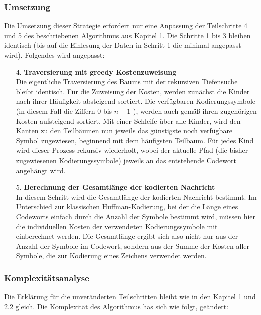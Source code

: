 \documentclass[a4paper,10pt,ngerman]{scrartcl}
\begin{document}
\subsubsection{Umsetzung}
Die Umsetzung dieser Strategie erfordert nur eine Anpassung der Teilschritte 4 und 5 des beschriebenen Algorithmus aus Kapitel 1. Die Schritte 1 bis 3 bleiben identisch (bis auf die Einlesung der Daten in Schritt 1 die minimal angepasst wird). Folgendes wird angepasst:

\begin{enumerate}
  \item [4.] \textbf{Traversierung mit greedy Kostenzuweisung}\\
  Die eigentliche Traversierung des Baums mit der rekursiven Tiefensuche bleibt identisch. Für die Zuweisung der Kosten, werden zunächst die Kinder nach ihrer Häufigkeit absteigend sortiert. Die verfügbaren Kodierungssymbole (in diesem Fall die Ziffern $0$ bis $n-1$ ), werden auch gemäß ihren zugehörigen Kosten aufsteigend sortiert. Mit einer Schleife über alle Kinder, wird den Kanten zu den Teilbäumen nun jeweils das günstigste noch verfügbare Symbol zugewiesen, beginnend mit dem häufigsten Teilbaum. Für jedes Kind wird dieser Prozess rekursiv wiederholt, wobei der aktuelle Pfad (die bisher zugewiesenen Kodierungssymbole) jeweils an das entstehende Codewort angehängt wird. 
  \item[5.] \textbf{Berechnung der Gesamtlänge der kodierten Nachricht}\\
  In diesem Schritt wird die Gesamtlänge der kodierten Nachricht bestimmt. Im Unterschied zur klassischen Huffman-Kodierung, bei der die Länge eines Codeworts einfach durch die Anzahl der Symbole bestimmt wird, müssen hier die individuellen Kosten der verwendeten Kodierungssymbole mit einberechnet werden. Die Gesamtlänge ergibt sich also nicht nur aus der Anzahl der Symbole im Codewort, sondern aus der Summe der Kosten aller Symbole, die zur Kodierung eines Zeichens verwendet werden. 
\end{enumerate}


\subsubsection{Komplexitätsanalyse}
Die Erklärung für die unveränderten Teilschritten bleibt wie in den Kapitel 1 und 2.2 gleich. Die Komplexität des Algorithmus has sich wie folgt, geändert:

\vspace{0.2cm}
\end{document}
